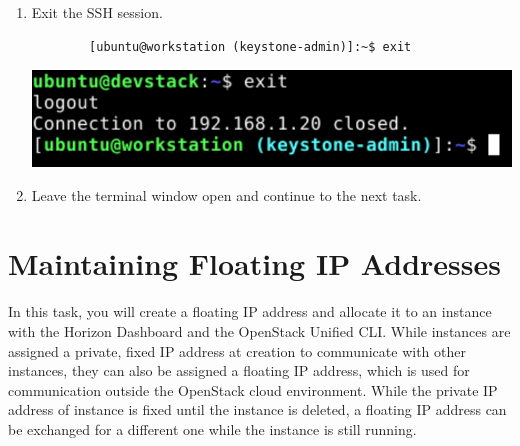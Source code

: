 \documentclass[letterpaper, 12pt]{article}
\begin{document}
\begin{enumerate}
    \item Exit the SSH session.
    \begin{lstlisting}
        [ubuntu@workstation (keystone-admin)]:~$ exit
    \end{lstlisting}

    \begin{center}
        \includegraphics[width=\linewidth]{images/part2/step18.png}
    \end{center}

    \item Leave the terminal window open and continue to the next task.

\end{enumerate}

\section{Maintaining Floating IP Addresses}
\label{sec:maintaining_floating_ip_addresses}
In this task, you will create a floating IP address and allocate it to an instance with the Horizon Dashboard and the OpenStack Unified CLI.
While instances are assigned a private, fixed IP address at creation to communicate with other instances, they can also be assigned a floating IP address, which is used for communication outside the OpenStack cloud environment.
While the private IP address of instance is fixed until the instance is deleted, a floating IP address can be exchanged for a different one while the instance is still running.
\end{document}
